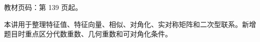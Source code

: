 
\begin{knowledgeBox}
教材页码：第 139 页起。

本讲用于整理特征值、特征向量、相似、对角化、实对称矩阵和二次型联系。新增题目时重点区分代数重数、几何重数和可对角化条件。
\end{knowledgeBox}
